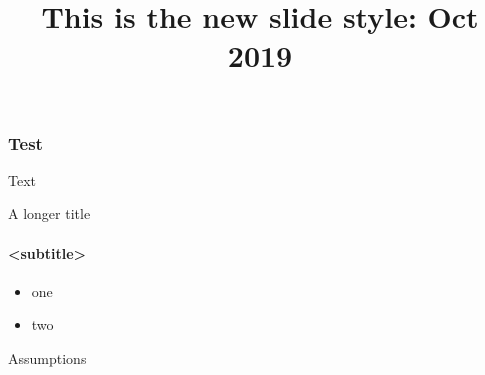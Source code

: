 \documentclass{beamer}
\begin{document}
\begin{frame}
\title{This is the new slide style: \newline Oct 2019}
\titlepage
\end{frame}

\begin{frame}
	\frametitle{Test}
	Text
\end{frame}

\begin{frame}{A longer title} 
	\framesubtitle{<subtitle>}
	\begin{itemize}
		\item one
		\item two
	\end{itemize}
Assumptions
\end{frame}
\end{document}

